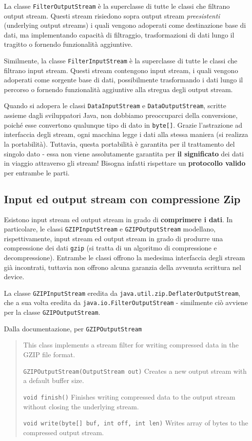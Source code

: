 \documentclass[\fontsizeclass,twocolumn]{\classname}
\theoremstyle{definition}
\theoremstyle{definition}
\begin{document}
La classe \texttt{FilterOutputStream} è la superclasse di tutte le classi che
filtrano output stream. Questi stream risiedono sopra output stream
\emph{preesistenti} (underlying output streams) i quali vengono adoperati come
destinazione base di dati, ma implementando capacità di filtraggio,
trasformazioni di dati lungo il tragitto o fornendo funzionalità aggiuntive.

Similmente, la classe \texttt{FilterInputStream} è la superclasse di tutte le
classi che filtrano input stream. Questi stream contengono input stream, i
quali vengono adoperati come sorgente base di dati, possibilmente trasformando
i dati lungo il percorso o fornendo funzionalità aggiuntive alla stregua degli
output stream.

Quando si adopera le classi \texttt{DataInputStream} e
\texttt{DataOutputStream}, scritte assieme dagli sviluppatori Java, non
dobbiamo preoccuparci della conversione, poiché esse convertono qualunque tipo
di dato in \texttt{byte[]}. Grazie l'astrazione ad interfaccia degli stream,
ogni macchina legge i dati alla stessa maniera (si realizza la portabilità).
Tuttavia, questa portabilità è garantita per il trattamento del singolo dato
\-- essa non viene assolutamente garantita per \textbf{il significato} dei dati
in viaggio attraverso gli stream! Bisogna infatti rispettare un
\textbf{protocollo valido} per entrambe le parti.

\subsection{Input ed output stream con compressione Zip}

Esistono input stream ed output stream in grado di \textbf{comprimere i dati}.
In particolare, le classi \texttt{GZIPInputStream} e \texttt{GZIPOutputStream}
modellano, rispettivamente, input stream ed output stream in grado di produrre
una compressione dei dati \texttt{gzip} (si tratta di un algoritmo di
compressione e decompressione). Entrambe le classi offrono la medesima
interfaccia degli stream già incontrati, tuttavia non offrono alcuna garanzia
della avvenuta scrittura nel device.

La classe \texttt{GZIPInputStream} eredita da
\texttt{java.util.zip.DeflaterOutputStream}, che a sua volta eredita da
\texttt{java.io.FilterOutputStream} \-- similmente ciò avviene per la classe
\texttt{GZIPOutputStream}.

Dalla documentazione, per \texttt{GZIPOutputStream}

\begin{quote}
    \footnotesize{This class implements a stream filter for writing compressed data in the GZIP file format.

    \texttt{GZIPOutputStream(OutputStream out)} 	Creates a new output stream with a default buffer size.

    \texttt{void 	finish()} 	Finishes writing compressed data to the output stream without closing the underlying stream.

    \texttt{void 	write(byte[] buf, int off, int len)} 	Writes array of bytes to the compressed output stream.
}
\end{quote}
\end{document}
